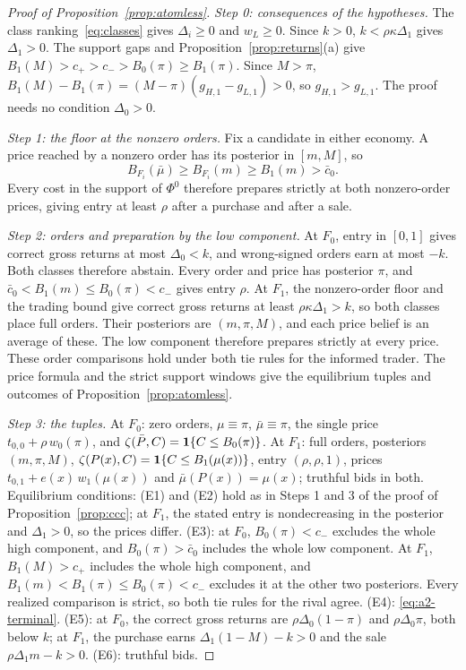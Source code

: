 \begin{proof}[Proof of Proposition~\ref{prop:atomless}]
\emph{Step 0: consequences of the hypotheses.} The class ranking~\eqref{eq:classes} gives \(\Delta_i\ge0\) and
\(w_L\ge0\). Since \(k>0\), \(k<\rho\kappa\Delta_1\) gives \(\Delta_1>0\). The support gaps and
Proposition~\ref{prop:returns}(a) give \(B_1(M)>c_+>c_->B_0(\pi)\ge B_1(\pi)\). Since \(M>\pi\),
\(B_1(M)-B_1(\pi)=(M-\pi)(g_{H,1}-g_{L,1})>0\), so \(g_{H,1}>g_{L,1}\). The proof needs no condition \(\Delta_0>0\).

\emph{Step 1: the floor at the nonzero orders.} Fix a candidate in either economy. A price reached by a
nonzero order has its posterior in \([m,M]\), so
\[
B_{F_i}(\bar\mu)\ge B_{F_i}(m)\ge B_1(m)>\bar c_0.
\]
Every cost in the support of \(\Phi^0\) therefore prepares strictly at both nonzero-order prices, giving entry
at least \(\rho\) after a purchase and after a sale.

\emph{Step 2: orders and preparation by the low component.} At \(F_0\), entry in \([0,1]\) gives correct gross
returns at most \(\Delta_0<k\), and wrong-signed orders earn at most \(-k\). Both classes therefore abstain.
Every order and price has posterior \(\pi\), and
\(\bar c_0<B_1(m)\le B_0(\pi)<c_-\) gives entry \(\rho\).
At \(F_1\), the nonzero-order floor and the trading bound give correct gross returns at least
\(\rho\kappa\Delta_1>k\), so both classes place full orders. Their posteriors are \((m,\pi,M)\), and each price
belief is an average of these. The low component therefore prepares strictly at every price. These order
comparisons hold under both tie rules for the informed trader. The price formula and the strict support windows give the
equilibrium tuples and outcomes of Proposition~\ref{prop:atomless}.


\emph{Step 3: the tuples.} At \(F_0\): zero orders, \(\mu\equiv\pi\), \(\bar\mu\equiv\pi\), the single price
\(t_{0,0}+\rho\,w_0(\pi)\), and \(\zeta(\bar P,C)=\mathbf{1}\{C\le B_0(\pi)\}\). At \(F_1\): full orders, posteriors
\((m,\pi,M)\), \(\zeta(P(x),C)=\mathbf{1}\{C\le B_1(\mu(x))\}\), entry \((\rho,\rho,1)\), prices
\(t_{0,1}+e(x)\,w_1(\mu(x))\) and \(\bar\mu(P(x))=\mu(x)\); truthful bids in both. Equilibrium conditions: (E1) and (E2) hold as
in Steps 1 and 3 of the proof of Proposition~\ref{prop:ccc}; at \(F_1\), the stated entry is nondecreasing in the
posterior and \(\Delta_1>0\), so the prices differ. (E3): at \(F_0\), \(B_0(\pi)<c_-\) excludes the whole high
component, and \(B_0(\pi)>\bar c_0\) includes the whole low component. At \(F_1\), \(B_1(M)>c_+\) includes the whole high
component, and \(B_1(m)<B_1(\pi)\le B_0(\pi)<c_-\) excludes it at the other two posteriors. Every realized
comparison is strict, so both tie rules for the rival agree. (E4): \eqref{eq:a2-terminal}. (E5): at \(F_0\), the correct gross
returns are \(\rho\Delta_0(1-\pi)\) and \(\rho\Delta_0\pi\), both below \(k\); at \(F_1\), the purchase earns
\(\Delta_1(1-M)-k>0\) and the sale \(\rho\Delta_1m-k>0\). (E6): truthful bids.


\end{proof}
